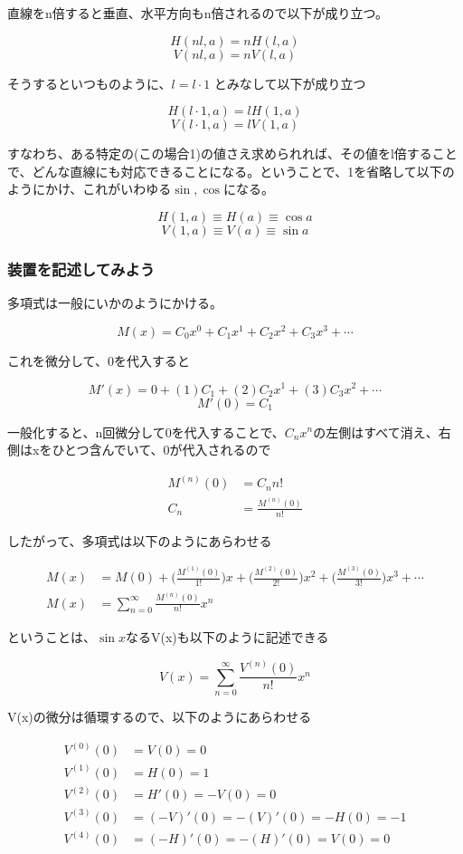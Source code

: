 \documentclass[dvipdfmx]{jsarticle}
\begin{document}
直線をn倍すると垂直、水平方向もn倍されるので以下が成り立つ。

\[ H(nl,a) = nH(l,a) \]
\[ V(nl,a) = nV(l,a) \]

そうするといつものように、$l= l \cdot 1$ とみなして以下が成り立つ

\[ H(l\cdot 1,a) = lH(1,a) \]
\[ V(l\cdot 1,a) = lV(1,a) \]

すなわち、ある特定の(この場合1)の値さえ求められれば、その値をl倍することで、どんな直線にも対応できることになる。ということで、1を省略して以下のようにかけ、これがいわゆる$\sin, \cos$になる。

\[ H(1,a) \equiv H(a) \equiv \cos a \]
\[ V(1,a) \equiv V(a) \equiv \sin a \]

\subsubsection{装置を記述してみよう}

多項式は一般にいかのようにかける。

\[ M(x) = C_0x^0 + C_1x^1 + C_2x^2 + C_3x^3 + \cdots \]

これを微分して、0を代入すると

\[ M'(x) = 0 + (1)C_1 + (2)C_2x^1 + (3)C_3x^2 + \cdots \]
\[ M'(0) = C_1 \]

一般化すると、n回微分して0を代入することで、$C_nx^n$の左側はすべて消え、右側はxをひとつ含んでいて、0が代入されるので

\begin{align*}
M^{(n)}(0) &= C_nn! \\
C_n &= \frac{M^{(n)}(0)}{n!}
\end{align*}

したがって、多項式は以下のようにあらわせる

\begin{align*}
M(x) &= M(0) + \biggl( \frac{M^{(1)}(0)}{1!}\biggl)x + \biggl( \frac{M^{(2)}(0)}{2!}\biggl)x^2 + \biggl( \frac{M^{(3)}(0)}{3!}\biggl)x^3 + \cdots \\
M(x) &= \sum_{n=0}^{\infty}\frac{M^{(n)}(0)}{n!}x^n
\end{align*}

ということは、$\sin x$なるV(x)も以下のように記述できる

\[ V(x) = \sum_{n=0}^{\infty} \frac{V^{(n)}(0)}{n!}x^n \]

V(x)の微分は循環するので、以下のようにあらわせる

\begin{align*}
V^{(0)}(0) &= V(0) = 0 \\
V^{(1)}(0) &= H(0) = 1 \\
V^{(2)}(0) &= H'(0) = -V(0) = 0 \\
V^{(3)}(0) &= (-V)'(0) = -(V)'(0) = -H(0) = -1 \\
V^{(4)}(0) &= (-H)'(0) = -(H)'(0) = V(0) = 0
\end{align*}
\end{document}
